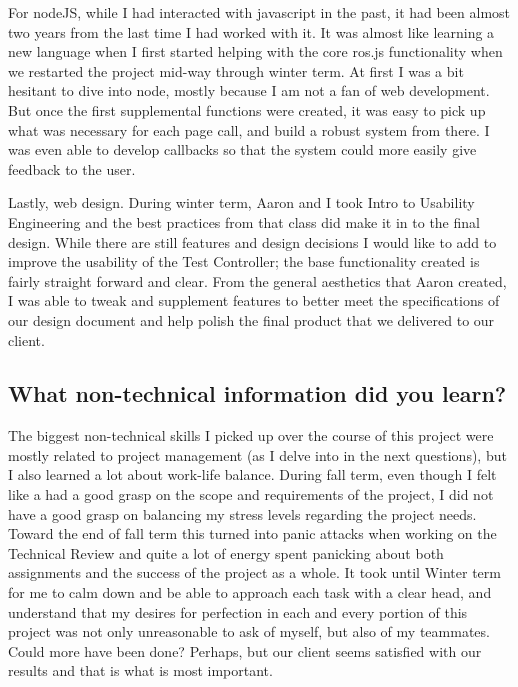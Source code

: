 \documentclass[onecolumn, draftclsnofoot,10pt, compsoc]{report}
\begin{document}
For nodeJS, while I had interacted with javascript in the past, it had been almost two years from the last time I had worked with it. It was almost like learning a new language when I first started helping with the core ros.js functionality when we restarted the project mid-way through winter term. At first I was a bit hesitant to dive into node, mostly because I am not a fan of web development. But once the first supplemental functions were created, it was easy to pick up what was necessary for each page call, and build a robust system from there. I was even able to develop callbacks so that the system could more easily give feedback to the user. 

Lastly, web design. During winter term, Aaron and I took Intro to Usability Engineering and the best practices from that class did make it in to the final design. While there are still features and design decisions I would like to add to improve the usability of the Test Controller; the base functionality created is fairly straight forward and clear. From the general aesthetics that Aaron created, I was able to tweak and supplement features to better meet the specifications of our design document and help polish the final product that we delivered to our client. 

\subsection{What non-technical information did you learn?}
The biggest non-technical skills I picked up over the course of this project were mostly related to project management (as I delve into in the next questions), but I also learned a lot about work-life balance. During fall term, even though I felt like a had a good grasp on the scope and requirements of the project, I did not have a good grasp on balancing my stress levels regarding the project needs. Toward the end of fall term this turned into panic attacks when working on the Technical Review and quite a lot of energy spent panicking about both assignments and the success of the project as a whole. It took until Winter term for me to calm down and be able to approach each task with a clear head, and understand that my desires for perfection in each and every portion of this project was not only unreasonable to ask of myself, but also of my teammates. Could more have been done? Perhaps, but our client seems satisfied with our results and that is what is most important. 
\end{document}
